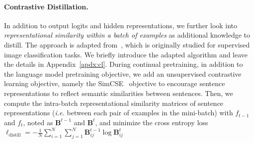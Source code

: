 



\paragraph{Contrastive Distillation.}
In addition to output logits and hidden representations, we further look into \textit{representational similarity within a batch of examples} as additional knowledge to distill. The approach is adapted from~\cite{Cha2021Co2LCC}, which is originally studied for supervised image classification tasks. %
We briefly introduce the adapted algorithm and leave the details in Appendix~\ref{apdx:cl}.
During continual pretraining, in addition to the language model pretraining objective, we add an unsupervised contrastive learning objective, namely the SimCSE~\cite{Gao2021SimCSESC} objective
to encourage sentence representations to reflect semantic similarities between sentences. Then, we compute the intra-batch representational similarity matrices of sentence representations (\textit{i.e.} between each pair of examples in the mini-batch) with $f_{t-1}$ and $f_t$, noted as $\mathbf{B}^{t-1}$ and $\mathbf{B}^{t}$, and minimize the cross entropy loss $\ell_{\text{distill}} = - \frac{1}{N} \sum_{i=1}^{N} \sum_{j=1}^{N} \mathbf{B}_{ij}^{t-1}\log \mathbf{B}_{ij}^{t}$


